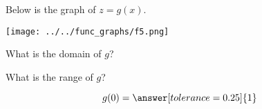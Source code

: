 \documentclass{ximera}
\author{Lee Wayand}
\begin{document}
\begin{exercise}  





Below is the graph of $z=g(x)$.  

\begin{image}
\texttt{[image: ../../func\_graphs/f5.png]}
\end{image}









\begin{question} 


What is the domain of $g$?\\


\begin{multipleChoice}
\choice {$[-4, 4]$}
\end{multipleChoice}

\end{question}






\begin{question} 


What is the range of $g$?\\


\begin{multipleChoice}
\choice {$[-4, 4]$}
\end{multipleChoice}


\end{question}









\begin{question} 



\[  g(0) = \answer[tolerance=0.25]{1}  \]

\end{question}











\end{exercise}
\end{document}
